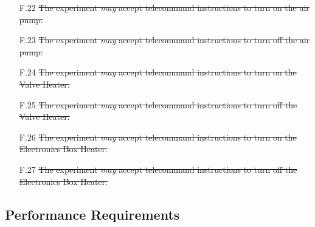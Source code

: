 \documentclass[a4paper,12pt,twoside]{article}
\providecommand{\DIFaddtex}[1]{{\protect\color{blue}\uwave{#1}}} %
\providecommand{\DIFaddend}{} %
\providecommand{\DIFadd}[1]{\texorpdfstring{\DIFaddtex{#1}}{#1}} %
\DeclareRobustCommand{\DIFaddend}{\DIFOaddend \let\includegraphics\DIFOincludegraphics} %
\begin{document}
\begin{enumerate}
{    }\item[F.22] \st{The experiment \textit{may} accept telecommand instructions to turn on the air pump.}\DIFadd{\textsuperscript{\ref{fn:unnecessary-requirement}}
    }\item[F.23] \st{The experiment \textit{may} accept telecommand instructions to turn off the air pump.}\DIFadd{\textsuperscript{\ref{fn:unnecessary-requirement}}
    }\item[F.24] \st{The experiment \textit{may} accept telecommand instructions to turn on the Valve Heater.}\DIFadd{\textsuperscript{\ref{fn:unnecessary-requirement}}
    }\item[F.25] \st{The experiment \textit{may} accept telecommand instructions to turn off the Valve Heater.}\DIFadd{\textsuperscript{\ref{fn:unnecessary-requirement}}
    }\item[F.26] \st{The experiment \textit{may} accept telecommand instructions to turn on the Electronics Box Heater.}\DIFadd{\textsuperscript{\ref{fn:unnecessary-requirement}}
    }\item[F.27] \st{The experiment \textit{may} accept telecommand instructions to turn off the Electronics Box Heater.}\DIFadd{\textsuperscript{\ref{fn:unnecessary-requirement}}
}\DIFaddend \end{enumerate}
\pagebreak
\subsection{Performance Requirements}
\end{document}
